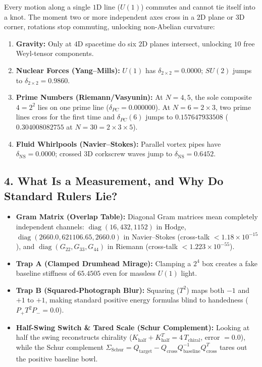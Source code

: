 \documentclass[11pt,a4paper]{article}
\begin{document}
Every motion along a single $1$D line ($U(1)$) commutes and cannot tie itself into a knot. The moment two or more independent axes cross in a $2$D plane or $3$D corner, rotations stop commuting, unlocking non-Abelian curvature:
\begin{enumerate}[leftmargin=1.6em]
  \item \textbf{Gravity:} Only at $4$D spacetime do six $2$D planes intersect, unlocking $10$ free Weyl-tensor components.
  \item \textbf{Nuclear Forces (Yang--Mills):} $U(1)$ has $\delta_{2\times 2} = 0.0000$; $SU(2)$ jumps to $\delta_{2\times 2} = 0.9860$.
  \item \textbf{Prime Numbers (Riemann/Vasyunin):} At $N=4,5$, the sole composite $4=2^2$ lies on one prime line ($\delta_{PC}=0.000000$). At $N=6=2\times 3$, two prime lines cross for the first time and $\delta_{PC}(6)$ jumps to $0.157647933508$ ($0.304008082755$ at $N=30=2\times 3\times 5$).
  \item \textbf{Fluid Whirlpools (Navier--Stokes):} Parallel vortex pipes have $\delta_{\mathrm{NS}}=0.0000$; crossed $3$D corkscrew waves jump to $\delta_{\mathrm{NS}}=0.6452$.
\end{enumerate}

\subsection*{4. What Is a Measurement, and Why Do Standard Rulers Lie?}

\begin{itemize}[leftmargin=1.6em]
  \item \textbf{Gram Matrix (Overlap Table):} Diagonal Gram matrices mean completely independent channels: $\operatorname{diag}(16, 432, 1152)$ in Hodge, $\operatorname{diag}(2660.0, 621106.65, 2660.0)$ in Navier--Stokes (cross-talk $< 1.18\times 10^{-15}$), and $\operatorname{diag}(G_{22}, G_{33}, G_{44})$ in Riemann (cross-talk $< 1.223\times 10^{-55}$).
  \item \textbf{Trap A (Clamped Drumhead Mirage):} Clamping a $2^4$ box creates a fake baseline stiffness of $65.4505$ even for massless $U(1)$ light.
  \item \textbf{Trap B (Squared-Photograph Blur):} Squaring ($T^2$) maps both $-1$ and $+1$ to $+1$, making standard positive energy formulas blind to handedness ($P_+ T^2 P_- = 0.0$).
  \item \textbf{Half-Swing Switch \& Tared Scale (Schur Complement):} Looking at half the swing reconstructs chirality ($K_{\mathrm{half}} + K_{\mathrm{half}}^T = 4\,T_{\mathrm{chiral}}$, error $= 0.0$), while the Schur complement $\Sigma_{\mathrm{Schur}} = Q_{\mathrm{target}} - Q_{\mathrm{cross}} Q_{\mathrm{baseline}}^{-1} Q_{\mathrm{cross}}^T$ tares out the positive baseline bowl.
\end{itemize}
\end{document}
